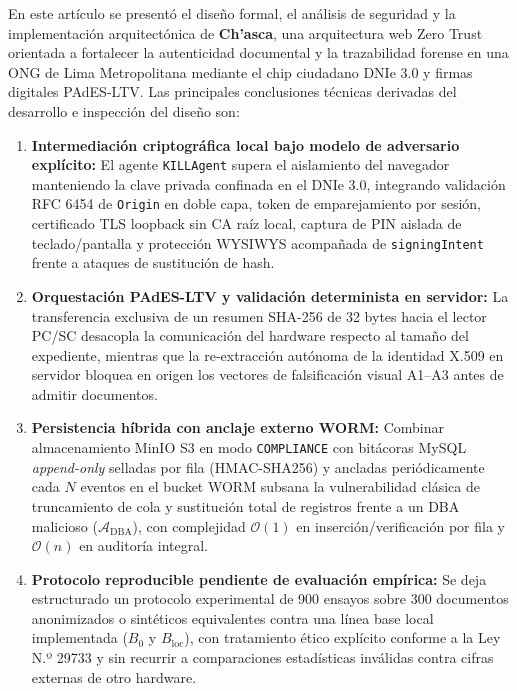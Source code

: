 \documentclass[runningheads,twocolumn]{llncs}
\begin{document}
En este artículo se presentó el diseño formal, el análisis de seguridad y la implementación arquitectónica de \textbf{Ch'asca}, una arquitectura web Zero Trust orientada a fortalecer la autenticidad documental y la trazabilidad forense en una ONG de Lima Metropolitana mediante el chip ciudadano DNIe 3.0 y firmas digitales PAdES-LTV. Las principales conclusiones técnicas derivadas del desarrollo e inspección del diseño son:

\begin{enumerate}
    \item \textbf{Intermediación criptográfica local bajo modelo de adversario explícito:} El agente \texttt{KILLAgent} supera el aislamiento del navegador manteniendo la clave privada confinada en el DNIe 3.0, integrando validación RFC 6454 \cite{rfc6454} de \texttt{Origin} en doble capa, token de emparejamiento por sesión, certificado TLS loopback sin CA raíz local, captura de PIN aislada de teclado/pantalla y protección WYSIWYS acompañada de \texttt{signingIntent} frente a ataques de sustitución de hash.
    \item \textbf{Orquestación PAdES-LTV y validación determinista en servidor:} La transferencia exclusiva de un resumen SHA-256 de 32 bytes hacia el lector PC/SC desacopla la comunicación del hardware respecto al tamaño del expediente, mientras que la re-extracción autónoma de la identidad X.509 en servidor bloquea en origen los vectores de falsificación visual A1--A3 antes de admitir documentos.
    \item \textbf{Persistencia híbrida con anclaje externo WORM:} Combinar almacenamiento MinIO S3 en modo \texttt{COMPLIANCE} con bitácoras MySQL \textit{append-only} selladas por fila (HMAC-SHA256) y ancladas periódicamente cada $N$ eventos en el bucket WORM subsana la vulnerabilidad clásica de truncamiento de cola y sustitución total de registros frente a un DBA malicioso ($\mathcal{A}_{\text{DBA}}$), con complejidad $\mathcal{O}(1)$ en inserción/verificación por fila y $\mathcal{O}(n)$ en auditoría integral.
    \item \textbf{Protocolo reproducible pendiente de evaluación empírica:} Se deja estructurado un protocolo experimental de 900 ensayos sobre 300 documentos anonimizados o sintéticos equivalentes contra una línea base local implementada ($B_0$ y $B_{\text{loc}}$), con tratamiento ético explícito conforme a la Ley N.º 29733 y sin recurrir a comparaciones estadísticas inválidas contra cifras externas de otro hardware.
\end{enumerate}
\end{document}
